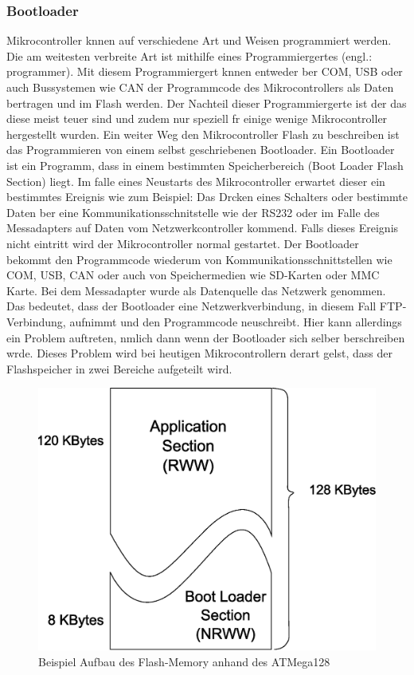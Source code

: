 \documentclass[a4paper]{book}%
\begin{document}
\subsubsection{Bootloader}


Mikrocontroller knnen auf verschiedene Art und Weisen programmiert werden. Die am weitesten verbreite Art ist mithilfe eines Programmiergertes (engl.: programmer). Mit diesem Programmiergert knnen entweder ber COM, USB oder auch Bussystemen wie CAN der Programmcode des Mikrocontrollers als Daten bertragen und im Flash werden. Der Nachteil dieser Programmiergerte ist der das diese meist teuer sind und zudem nur speziell fr einige wenige Mikrocontroller hergestellt wurden.
Ein weiter Weg den Mikrocontroller Flash zu beschreiben ist das Programmieren von einem selbst geschriebenen Bootloader. 
Ein Bootloader ist ein Programm, dass in einem bestimmten Speicherbereich (Boot Loader Flash Section) liegt. Im falle eines Neustarts des Mikrocontroller erwartet dieser ein bestimmtes Ereignis wie zum Beispiel: Das Drcken eines Schalters oder bestimmte Daten ber eine Kommunikationsschnitstelle wie der RS232 oder im Falle des Messadapters auf Daten vom Netzwerkcontroller kommend. Falls dieses Ereignis nicht eintritt wird der Mikrocontroller normal gestartet. Der Bootloader bekommt den Programmcode wiederum von Kommunikationsschnittstellen wie COM, USB, CAN oder auch von Speichermedien wie SD-Karten oder MMC Karte.
Bei dem Messadapter wurde als Datenquelle das Netzwerk genommen. Das bedeutet, dass der Bootloader eine Netzwerkverbindung, in diesem Fall FTP-Verbindung,  aufnimmt und den Programmcode neuschreibt. Hier kann allerdings ein Problem auftreten, nmlich dann wenn der Bootloader sich selber berschreiben wrde. Dieses Problem wird bei heutigen Mikrocontrollern derart gelst, dass der Flashspeicher in zwei Bereiche aufgeteilt wird.




\begin{figure}[H]
	\centering
	\includegraphics[width=1.0\textwidth]{figures/flashmemory.eps}
	\caption[Beispiel Aufbau des Flash-Memory anhand des ATMega128]{Beispiel Aufbau des Flash-Memory anhand des ATMega128}
	\label{fig:flash}
\end{figure}
\end{document}
